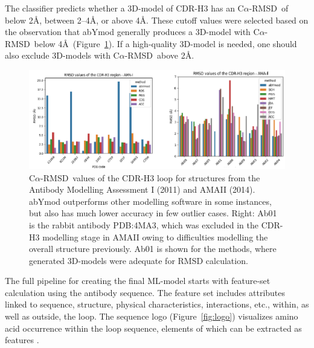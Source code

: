 \documentclass[12pt]{article}
\newcommand{\carmsd}{\mbox{C$\alpha$-RMSD}}
\begin{document}
The classifier predicts whether a 3D-model of CDR-H3 has an \carmsd\ of below 2\AA,
between 2--4\AA, or above 4\AA. These cutoff values were selected
based on the observation that abYmod generally produces a 3D-model with
\carmsd\ below 4\AA\  (Figure~\ref{fig:AMA}). 
If a high-quality 3D-model is needed, one should also
exclude 3D-models with \carmsd\ above 2\AA.

\begin{figure}
  \centering
  \includegraphics[width=\linewidth]{AMA.eps}
  \caption {\carmsd\ values of the CDR-H3 loop for structures from the
    Antibody Modelling Assessment I (2011) and AMAII (2014). abYmod
    outperforms other modelling software in some instances, but also
    has much lower accuracy in few outlier cases. 
    Right: Ab01 is the rabbit antibody PDB:4MA3, which was
    excluded in the CDR-H3 modelling stage in AMAII owing to
    difficulties modelling the overall structure previously. Ab01 is
    shown for the methods, where generated 3D-models were adequate for
    RMSD calculation.}
  \label{fig:AMA}
\end{figure}

The full pipeline for creating the final ML-model
starts with 
feature-set calculation using the antibody sequence. The feature set
includes attributes linked to sequence, structure, physical
characteristics, interactions, etc., within, as well as outside, the
loop. 
The sequence logo (Figure~\ref{fig:logo}) visualizes amino acid
occurrence within the loop sequence, elements of which can be
extracted as features \cite{Thomsen2012,Shaner1993}.
\end{document}
